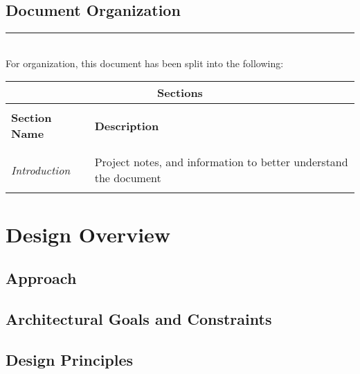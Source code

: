 \documentclass[]{article}
\newcommand{\HRule}{\rule{\linewidth}{0.5mm}}
\begin{document}
	
	\subsection{Document Organization}
	\HRule \\[0.5cm]
	For organization, this document has been split into the following:
	\begin{longtable}{|l|l|}			
		\multicolumn{2}{c}{\LARGE \textbf{Sections}} \\
			
		\hline
		& \\
		\textbf{Section Name} & \textbf{Description} \\
		& \\
		\hline
		
		& \\
		\emph{Introduction} & Project notes, and information to better understand the 
		document \\
		& \\
		\hline
		
	\end{longtable}
	
	
	\newpage
	\section{Design Overview}

	
	\subsection{Approach}

	
	\subsection{Architectural Goals and Constraints}

	
	\subsection{Design Principles}

	
\end{document}
